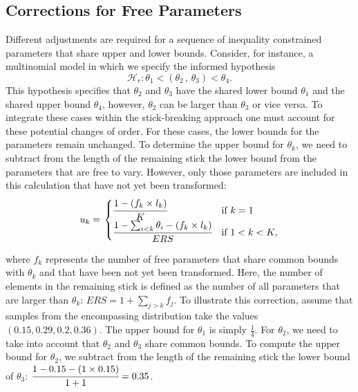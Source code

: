 \begin{appendix}
\hypertarget{corrections-for-free-parameters}{%
\subsection{Corrections for Free
Parameters}\label{corrections-for-free-parameters}}

Different adjustments are required for a sequence of inequality
constrained parameters that share upper and lower bounds. Consider, for
instance, a multinomial model in which we specify the informed
hypothesis
\[\mathcal{H}_r: \theta_1 < ( \theta_2 \, , \, \theta_3) < \theta_4.\]
This hypothesis specifies that \(\theta_2\) and \(\theta_3\) have the
shared lower bound \(\theta_1\) and the shared upper bound \(\theta_4\),
however, \(\theta_2\) can be larger than \(\theta_3\) or vice versa. To
integrate these cases within the stick-breaking approach one must
account for these potential changes of order. For these cases, the lower
bounds for the parameters remain unchanged. To determine the upper bound
for \(\theta_k\), we need to subtract from the length of the remaining
stick the lower bound from the parameters that are free to vary.
However, only those parameters are included in this calculation that
have not yet been transformed: \begin{align}
  u_k = \left.
  \begin{cases}
      \cfrac{1 - (f_k \times l_k)}{K} & \text{if } k = 1 \\
      \cfrac{1 - \sum_{i < k} \theta_i - (f_k \times l_k)}{ERS} & \text{if } 1 < k < K,
  \end{cases}
    \right.
\end{align}

\noindent where \(f_k\) represents the number of free parameters that
share common bounds with \(\theta_k\) and that have been not yet been
transformed. Here, the number of elements in the remaining stick is
defined as the number of all parameters that are larger than
\(\theta_k\): \(ERS = 1 + \sum_{j > k} f_j\). To illustrate this
correction, assume that samples from the encompassing distribution take
the values \((0.15, 0.29, 0.2, 0.36)\). The upper bound for \(\theta_1\)
is simply \(\frac{1}{4}\). For \(\theta_2\), we need to take into
account that \(\theta_2\) and \(\theta_3\) share common bounds. To
compute the upper bound for \(\theta_2\), we subtract from the length of
the remaining stick the lower bound of \(\theta_3\):
\(\cfrac{1 - 0.15 - (1 \times 0.15)}{1 + 1} = 0.35\).


\end{appendix}
